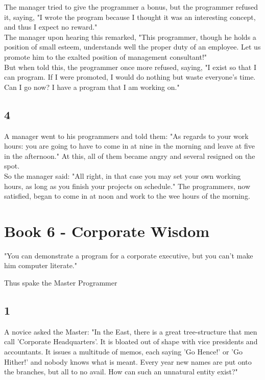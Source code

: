 \documentclass[14pt, letterpaper]{book}
\begin{document}
The manager tried to give the programmer a bonus, but the programmer refused it, saying, "I wrote the program because I thought it was an interesting concept, and thus I expect no reward."\\

The manager upon hearing this remarked, "This programmer, though he holds a position of small esteem, understands well the proper duty of an employee. Let us promote him to the exalted position of management consultant!"\\

But when told this, the programmer once more refused, saying, "I exist so that I can program. If I were promoted, I would do nothing but waste everyone's time. Can I go now? I have a program that I am working on."

\section*{4}
A manager went to his programmers and told them: "As regards to your work hours: you are going to have to come in at nine in the morning and leave at five in the afternoon." At this, all of them became angry and several resigned on the spot.\\

So the manager said: "All right, in that case you may set your own working hours, as long as you finish your projects on schedule." The programmers, now satisfied, began to come in at noon and work to the wee hours of the morning.

\chapter*{Book 6 - Corporate Wisdom}
\epigraph{"You can demonstrate a program for a corporate executive, but you can't make him computer literate."}{Thus spake the Master Programmer}

\section*{1}
A novice asked the Master: "In the East, there is a great tree-structure that men call 'Corporate Headquarters'. It is bloated out of shape with vice presidents and accountants. It issues a multitude of memos, each saying 'Go Hence!' or 'Go Hither!' and nobody knows what is meant. Every year new names are put onto the branches, but all to no avail. How can such an unnatural entity exist?"\\
\end{document}
